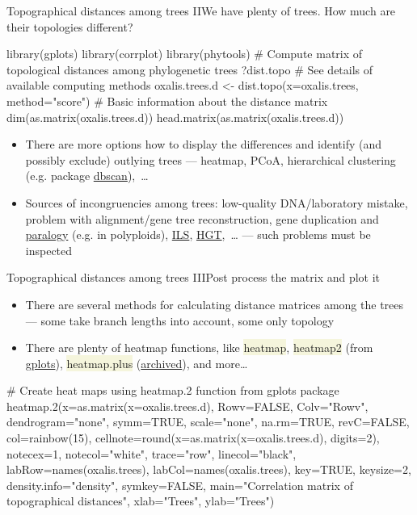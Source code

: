 \documentclass[compress, xelatex, 11pt, xcolor=svgnames, aspectratio=169,
	hyperref={
		bookmarks=true,
		unicode=true,
		colorlinks=true,
		pdftitle={Molecular data in R},
		plainpages=false,
		pdfauthor={Vojtech Zeisek},
		pdfsubject={Course about phylogeny and evolution in R},
		pdfcreator={XeLaTeX},
		pdfkeywords={R, evolution, phylogeny, molecular data},
		linkcolor=Crimson, %
		anchorcolor=Magenta, %
		citecolor=Magenta, %
		filecolor=Magenta, %
		menucolor=Magenta, %
		urlcolor=DodgerBlue, %
		},
	url={hyphens, lowtilde} %
	]{beamer}
\renewcommand{\texttt}[1]{\colorbox{Beige}{{\ttfamily #1}}}
\begin{document}
\begin{frame}[fragile]{Topographical distances among trees II}{We have plenty of trees. How much are their topologies different?}
	\begin{spluscode}
    library(gplots)
    library(corrplot)
    library(phytools)
    # Compute matrix of topological distances among phylogenetic trees
    ?dist.topo # See details of available computing methods
    oxalis.trees.d <- dist.topo(x=oxalis.trees, method="score")
    # Basic information about the distance matrix
    dim(as.matrix(oxalis.trees.d))
    head.matrix(as.matrix(oxalis.trees.d))
	\end{spluscode}
	\begin{itemize}
		\item There are more options how to display the differences and identify (and possibly exclude) outlying trees --- heatmap, PCoA, hierarchical clustering (e.g. package \href{https://CRAN.R-project.org/package=dbscan}{dbscan}),~\ldots
		\item Sources of incongruencies among trees: low-quality DNA/laboratory mistake, problem with alignment/gene tree reconstruction, gene duplication and \href{https://en.wikipedia.org/wiki/Sequence_homology}{paralogy} (e.g. in polyploids), \href{https://en.wikipedia.org/wiki/Incomplete_lineage_sorting}{ILS}, \href{https://en.wikipedia.org/wiki/Horizontal_gene_transfer}{HGT},~\ldots{ } --- such problems must be inspected
	\end{itemize}
\end{frame}

\begin{frame}[fragile]{Topographical distances among trees III}{Post process the matrix and plot it}
	\begin{itemize}
		\item There are several methods for calculating distance matrices among the trees --- some take branch lengths into account, some only topology
		\item There are plenty of heatmap functions, like \texttt{heatmap}, \texttt{heatmap2} (from \href{https://cran.r-project.org/package=gplots}{gplots}), \texttt{heatmap.plus} (\href{https://cran.r-project.org/package=heatmap.plus}{archived}), and more\ldots
	\end{itemize}
	\begin{spluscode}
    # Create heat maps using heatmap.2 function from gplots package
    heatmap.2(x=as.matrix(x=oxalis.trees.d), Rowv=FALSE, Colv="Rowv",
      dendrogram="none", symm=TRUE, scale="none", na.rm=TRUE, revC=FALSE,
      col=rainbow(15), cellnote=round(x=as.matrix(x=oxalis.trees.d), digits=2),
      notecex=1, notecol="white", trace="row", linecol="black",
      labRow=names(oxalis.trees), labCol=names(oxalis.trees), key=TRUE,
      keysize=2, density.info="density", symkey=FALSE, main="Correlation
      matrix of topographical distances", xlab="Trees", ylab="Trees")
	\end{spluscode}
\end{frame}
\end{document}
